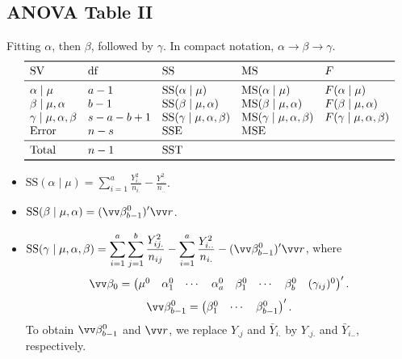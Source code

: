 \subsection*{ANOVA Table II}
Fitting $ \alpha $, then $ \beta $, followed by $ \gamma $. In compact notation,
$ \alpha\to\beta\to \gamma $.
\[ \begin{array}{lllll}
        \toprule
        \text{SV}                   & \text{df} & \text{SS}                              & \text{MS}                              & F                              \\
        \midrule
        \alpha\mid \mu              & a-1       & \text{SS}(\alpha\mid \mu)              & \text{MS}(\alpha\mid \mu)              & F(\alpha\mid \mu)              \\
        \beta\mid \mu,\alpha        & b-1       & \text{SS}(\beta\mid \mu,\alpha)        & \text{MS}(\beta\mid \mu,\alpha)        & F(\beta\mid \mu,\alpha)        \\

        \gamma\mid \mu,\alpha,\beta & s-a-b+1   & \text{SS}(\gamma\mid \mu,\alpha,\beta) & \text{MS}(\gamma\mid \mu,\alpha,\beta) & F(\gamma\mid \mu,\alpha,\beta) \\
        \text{Error}                & n-s       & \SSE                                   & \MSE                                                                    \\
        \midrule
        \text{Total}                & n-1       & \SST                                                                                                             \\
        \bottomrule
    \end{array} \]
\begin{itemize}
    \item $ \displaystyle \text{SS}(\alpha\mid \mu)=\sum_{i=1}^{a}\frac{Y_{i..}^2}{n_{i.}}-\frac{Y_{...}^2}{n_{..}} $.
    \item $ \displaystyle \text{SS}(\beta\mid \mu,\alpha)=(\Vector{\beta}_{b-1}^0)' \Vector{r} $.
    \item $ \displaystyle \text{SS}(\gamma\mid \mu,\alpha,\beta)=\sum_{i=1}^{a}\sum_{j=1}^{b}\frac{Y_{ij.}^2}{n_{ij}}-\sum_{i=1}^{a}\frac{Y_{i..}^2}{n_{i.}}-(\Vector{\beta}_{b-1}^0)' \Vector{r} $,
          where
          \[ \Vector{\beta}_0=\begin{pmatrix}
                  \mu^0 & \alpha_1^0 & \cdots & \alpha_a^0 & \beta_1^0 & \cdots & \beta_b^0 & (\gamma_{ij})^0
              \end{pmatrix}'. \]
          \[ \Vector{\beta}_{b-1}^0=\begin{pmatrix}
                  \beta_1^0 & \cdots & \beta_{b-1}^0
              \end{pmatrix}'. \]
          To obtain $ \Vector{\beta}_{b-1}^0 $ and $ \Vector{r} $, we
          replace $ Y_{.j} $ and $ \bar{Y}_{i.} $ by
          $ Y_{.j.} $ and $ \bar{Y}_{i..} $, respectively.
\end{itemize}
